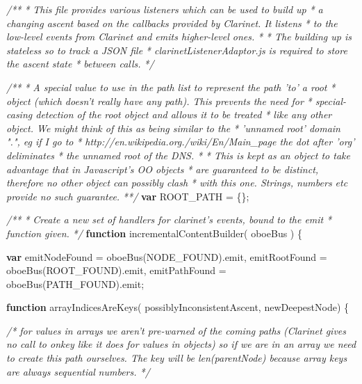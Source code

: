 \documentclass[12pt, ]{article}
\newenvironment{Shaded}{}{}
\newcommand{\KeywordTok}[1]{\textcolor[rgb]{0.00,0.44,0.13}{\textbf{{#1}}}}
\newcommand{\CommentTok}[1]{\textcolor[rgb]{0.38,0.63,0.69}{\textit{{#1}}}}
\newcommand{\FunctionTok}[1]{\textcolor[rgb]{0.02,0.16,0.49}{{#1}}}
\newcommand{\NormalTok}[1]{{#1}}
\begin{document}
\begin{Shaded}
\begin{Highlighting}[]
\CommentTok{/** }
\CommentTok{ * This file provides various listeners which can be used to build up}
\CommentTok{ * a changing ascent based on the callbacks provided by Clarinet. It listens}
\CommentTok{ * to the low-level events from Clarinet and emits higher-level ones.}
\CommentTok{ *  }
\CommentTok{ * The building up is stateless so to track a JSON file}
\CommentTok{ * clarinetListenerAdaptor.js is required to store the ascent state}
\CommentTok{ * between calls.}
\CommentTok{ */}



\CommentTok{/** }
\CommentTok{ * A special value to use in the path list to represent the path 'to' a root }
\CommentTok{ * object (which doesn't really have any path). This prevents the need for }
\CommentTok{ * special-casing detection of the root object and allows it to be treated }
\CommentTok{ * like any other object. We might think of this as being similar to the }
\CommentTok{ * 'unnamed root' domain ".", eg if I go to }
\CommentTok{ * http://en.wikipedia.org./wiki/En/Main_page the dot after 'org' deliminates }
\CommentTok{ * the unnamed root of the DNS.}
\CommentTok{ * }
\CommentTok{ * This is kept as an object to take advantage that in Javascript's OO objects }
\CommentTok{ * are guaranteed to be distinct, therefore no other object can possibly clash }
\CommentTok{ * with this one. Strings, numbers etc provide no such guarantee. }
\CommentTok{ **/}
\KeywordTok{var} \NormalTok{ROOT_PATH = \{\};}


\CommentTok{/**}
\CommentTok{ * Create a new set of handlers for clarinet's events, bound to the emit }
\CommentTok{ * function given.  }
\CommentTok{ */} 
\KeywordTok{function} \FunctionTok{incrementalContentBuilder}\NormalTok{( oboeBus ) \{}

   \KeywordTok{var} \NormalTok{emitNodeFound = }\FunctionTok{oboeBus}\NormalTok{(NODE_FOUND).}\FunctionTok{emit}\NormalTok{,}
       \NormalTok{emitRootFound = }\FunctionTok{oboeBus}\NormalTok{(ROOT_FOUND).}\FunctionTok{emit}\NormalTok{,}
       \NormalTok{emitPathFound = }\FunctionTok{oboeBus}\NormalTok{(PATH_FOUND).}\FunctionTok{emit}\NormalTok{;}

   \KeywordTok{function} \FunctionTok{arrayIndicesAreKeys}\NormalTok{( possiblyInconsistentAscent, newDeepestNode) \{}
   
      \CommentTok{/* for values in arrays we aren't pre-warned of the coming paths }
\CommentTok{         (Clarinet gives no call to onkey like it does for values in objects) }
\CommentTok{         so if we are in an array we need to create this path ourselves. The }
\CommentTok{         key will be len(parentNode) because array keys are always sequential }
\CommentTok{         numbers. */}


\end{Highlighting}
\end{Shaded}
\end{document}
